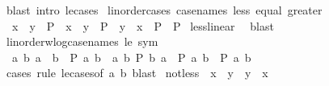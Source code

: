 \begin{isabellebody}
%
\isadelimproof
%
\endisadelimproof
%
\isatagproof
{}\isamarkupfalse%
\ {\isacharparenleft}{\kern0pt}blast\ intro{\isacharcolon}{\kern0pt}\ le{\isacharunderscore}{\kern0pt}cases{\isacharparenright}{\kern0pt}%
\endisatagproof
{\isafoldproof}%
%
\isadelimproof
\isanewline
%
\endisadelimproof
\isanewline
{}\isamarkupfalse%
\ linorder{\isacharunderscore}{\kern0pt}cases\ {\isacharbrackleft}{\kern0pt}case{\isacharunderscore}{\kern0pt}names\ less\ equal\ greater{\isacharbrackright}{\kern0pt}{\isacharcolon}{\kern0pt}\isanewline
\ \ {\isachardoublequoteopen}{\isacharparenleft}{\kern0pt}x\ {\isacharless}{\kern0pt}\ y\ {\isasymLongrightarrow}\ P{\isacharparenright}{\kern0pt}\ {\isasymLongrightarrow}\ {\isacharparenleft}{\kern0pt}x\ {\isacharequal}{\kern0pt}\ y\ {\isasymLongrightarrow}\ P{\isacharparenright}{\kern0pt}\ {\isasymLongrightarrow}\ {\isacharparenleft}{\kern0pt}y\ {\isacharless}{\kern0pt}\ x\ {\isasymLongrightarrow}\ P{\isacharparenright}{\kern0pt}\ {\isasymLongrightarrow}\ P{\isachardoublequoteclose}\isanewline
%
\isadelimproof
%
\endisadelimproof
%
\isatagproof
{}\isamarkupfalse%
\ less{\isacharunderscore}{\kern0pt}linear\ \isamarkupfalse%
\ blast%
\endisatagproof
{\isafoldproof}%
%
\isadelimproof
\isanewline
%
\endisadelimproof
\isanewline
{}\isamarkupfalse%
\ linorder{\isacharunderscore}{\kern0pt}wlog{\isacharbrackleft}{\kern0pt}case{\isacharunderscore}{\kern0pt}names\ le\ sym{\isacharbrackright}{\kern0pt}{\isacharcolon}{\kern0pt}\isanewline
\ \ {\isachardoublequoteopen}{\isacharparenleft}{\kern0pt}{\isasymAnd}a\ b{\isachardot}{\kern0pt}\ a\ {\isasymle}\ b\ {\isasymLongrightarrow}\ P\ a\ b{\isacharparenright}{\kern0pt}\ {\isasymLongrightarrow}\ {\isacharparenleft}{\kern0pt}{\isasymAnd}a\ b{\isachardot}{\kern0pt}\ P\ b\ a\ {\isasymLongrightarrow}\ P\ a\ b{\isacharparenright}{\kern0pt}\ {\isasymLongrightarrow}\ P\ a\ b{\isachardoublequoteclose}\isanewline
%
\isadelimproof
\ \ %
\endisadelimproof
%
\isatagproof
{}\isamarkupfalse%
\ {\isacharparenleft}{\kern0pt}cases\ rule{\isacharcolon}{\kern0pt}\ le{\isacharunderscore}{\kern0pt}cases{\isacharbrackleft}{\kern0pt}of\ a\ b{\isacharbrackright}{\kern0pt}{\isacharparenright}{\kern0pt}\ blast{\isacharplus}{\kern0pt}%
\endisatagproof
{\isafoldproof}%
%
\isadelimproof
\isanewline
%
\endisadelimproof
\isanewline
{}\isamarkupfalse%
\ not{\isacharunderscore}{\kern0pt}less{\isacharcolon}{\kern0pt}\ {\isachardoublequoteopen}{\isasymnot}\ x\ {\isacharless}{\kern0pt}\ y\ {\isasymlongleftrightarrow}\ y\ {\isasymle}\ x{\isachardoublequoteclose}\isanewline

\end{isabellebody}
